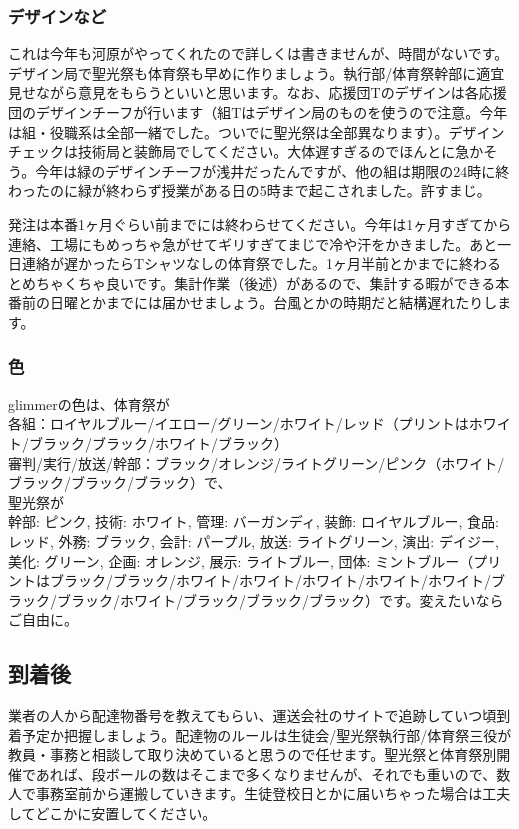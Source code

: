\documentclass[a4paper]{ltjsreport}
\begin{document}
\subsubsection{デザインなど}
これは今年も河原がやってくれたので詳しくは書きませんが、時間がないです。デザイン局で聖光祭も体育祭も早めに作りましょう。執行部/体育祭幹部に適宜見せながら意見をもらうといいと思います。なお、応援団Tのデザインは各応援団のデザインチーフが行います（組Tはデザイン局のものを使うので注意。今年は組・役職系は全部一緒でした。ついでに聖光祭は全部異なります）。デザインチェックは技術局と装飾局でしてください。大体遅すぎるのでほんとに急かそう。今年は緑のデザインチーフが浅井だったんですが、他の組は期限の24時に終わったのに緑が終わらず授業がある日の5時まで起こされました。許すまじ。

発注は本番1ヶ月ぐらい前までには終わらせてください。今年は1ヶ月すぎてから連絡、工場にもめっちゃ急がせてギリすぎてまじで冷や汗をかきました。あと一日連絡が遅かったらTシャツなしの体育祭でした。1ヶ月半前とかまでに終わるとめちゃくちゃ良いです。集計作業（後述）があるので、集計する暇ができる本番前の日曜とかまでには届かせましょう。台風とかの時期だと結構遅れたりします。

\subsubsection{色}
glimmerの色は、体育祭が\\
各組：ロイヤルブルー/イエロー/グリーン/ホワイト/レッド（プリントはホワイト/ブラック/ブラック/ホワイト/ブラック）\\
審判/実行/放送/幹部：ブラック/オレンジ/ライトグリーン/ピンク（ホワイト/ブラック/ブラック/ブラック）で、\\
聖光祭が\\
幹部: ピンク, 技術: ホワイト, 管理: バーガンディ, 装飾: ロイヤルブルー, 食品: レッド, 外務: ブラック, 会計: パープル, 放送: ライトグリーン, 演出: デイジー, 美化: グリーン, 企画: オレンジ, 展示: ライトブルー, 団体: ミントブルー（プリントはブラック/ブラック/ホワイト/ホワイト/ホワイト/ホワイト/ホワイト/ブラック/ブラック/ホワイト/ブラック/ブラック/ブラック）です。変えたいならご自由に。

\subsection{到着後}
業者の人から配達物番号を教えてもらい、運送会社のサイトで追跡していつ頃到着予定か把握しましょう。配達物のルールは生徒会/聖光祭執行部/体育祭三役が教員・事務と相談して取り決めていると思うので任せます。聖光祭と体育祭別開催であれば、段ボールの数はそこまで多くなりませんが、それでも重いので、数人で事務室前から運搬していきます。生徒登校日とかに届いちゃった場合は工夫してどこかに安置してください。
\end{document}
